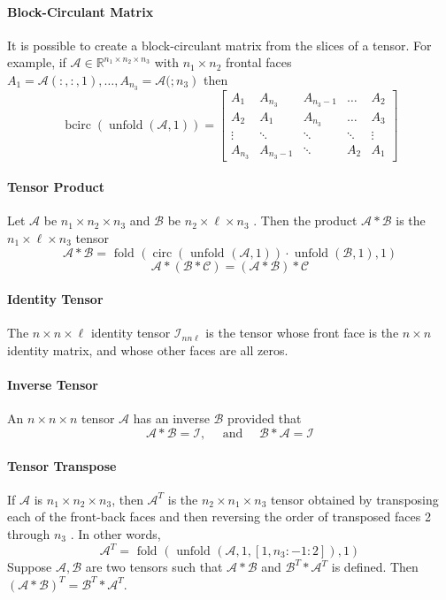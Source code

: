 \documentclass[english]{article}
\newcommand{\<}{\langle}
\renewcommand{\>}{\rangle}
\theoremstyle{definition}
\begin{document}
\paragraph{Block-Circulant Matrix} It is possible to create a block-circulant matrix from the slices of a tensor. For example, if  $\mathcal{A} \in \mathbb{R}^{n_{1} \times n_{2} \times n_{3}}$  with  $n_{1} \times n_{2}$  frontal faces  $A_{1}=\mathcal{A}(:,:, 1), \ldots, A_{n_{3}}=\mathcal{A}( 
\left.; n_{3}\right)$  then
\begin{equation*}
\operatorname{bcirc}(\operatorname{unfold}(\mathcal{A}, 1))=\left[\begin{array}{ccccc}
A_{1} & A_{n_{3}} & A_{n_{3}-1} & \dots & A_{2} \\
A_{2} & A_{1} & A_{n_{3}} & \dots & A_{3} \\
\vdots & \ddots & \ddots & \ddots & \vdots \\
A_{n_{3}} & A_{n_{3}-1} & \ddots & A_{2} & A_{1}
\end{array}\right]
\end{equation*}
\paragraph{Tensor Product} Let  $\mathcal{A}$  be  $n_{1} \times n_{2} \times n_{3}$  and  $\mathcal{B}$  be  $n_{2} \times \ell \times n_{3}$ .  Then the product
$\mathcal{A} * \mathcal{B}$  is the  $n_{1} \times \ell \times n_{3}$  tensor
$$\mathcal{A} * \mathcal{B}=\text { fold }(\operatorname{circ}(\text { unfold }(\mathcal{A}, 1)) \cdot \operatorname{unfold}(\mathcal{B}, 1), 1)$$
  $$\mathcal{A} *(\mathcal{B} * \mathcal{C})=(\mathcal{A} * \mathcal{B}) * \mathcal{C}$$
\paragraph{Identity Tensor} The  $n \times n \times \ell$  identity tensor  $\mathcal{I}_{n n \ell}$  is the tensor whose front face is the  $n \times n$  identity matrix, and whose other faces are all zeros.
\paragraph{Inverse Tensor} An  $n \times n \times n$  tensor  $\mathcal{A}$  has an inverse  $\mathcal{B}$  provided that
$$\mathcal{A} * \mathcal{B}=\mathcal{I}, \quad \text { and } \quad \mathcal{B} * \mathcal{A}=\mathcal{I}$$
\paragraph{Tensor Transpose} If  $\mathcal{A}$  is  $n_{1} \times n_{2} \times n_{3}$,  then  $\mathcal{A}^{T}$  is the $ n_{2} \times n_{1} \times n_{3}$  tensor obtained by transposing each of the front-back faces and then reversing the order of transposed faces 2 through  $n_{3}$ . In other words,
$$\mathcal{A}^{T}=\text { fold }\left(\text { unfold }\left(\mathcal{A}, 1,\left[1, n_{3}:-1: 2\right]\right), 1\right)$$
   Suppose  $\mathcal{A}, \mathcal{B}$  are two tensors such that  $\mathcal{A} * \mathcal{B}$  and  $\mathcal{B}^{T} * \mathcal{A}^{T}$  is defined. Then  $(\mathcal{A} * \mathcal{B})^{T}=\mathcal{B}^{T} * \mathcal{A}^{T}$.
\end{document}
